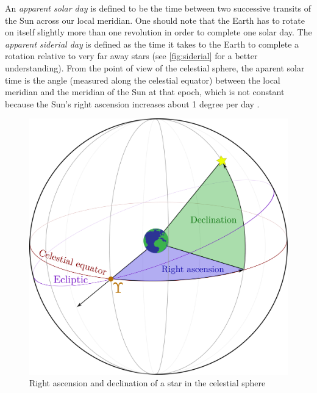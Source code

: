 \documentclass[../main.tex]{subfiles}
\begin{document}
An \emph{apparent solar day} is defined to be the time between two successive transits of the Sun across our local meridian. One should note that the Earth has to rotate on itself slightly more than one revolution in order to complete one solar day. The \emph{apparent siderial day} is defined as the time it takes to the Earth to complete a rotation relative to very far away stars (see \cref{fig:siderial} for a better understanding). From the point of view of the celestial sphere, the aparent solar time is the angle (measured along the celestial equator) between the local meridian and the meridian of the Sun at that epoch, which is not constant because the Sun's right ascension increases about 1 degree per day \cite{montenbruck}.

\begin{figure}[htbp]
  \centering
  \begin{minipage}[ht]{0.48\textwidth}
    \centering
    \includegraphics[width=\textwidth]{Images/right_ascension-decli.pdf}
    \caption{Right ascension and declination of a star in the celestial sphere}
    \label{fig:right_ascesion}
  \end{minipage}
  \hfill
  \begin{minipage}[ht]{0.48\textwidth}
    \centering

\end{minipage}
\end{figure}
\end{document}
